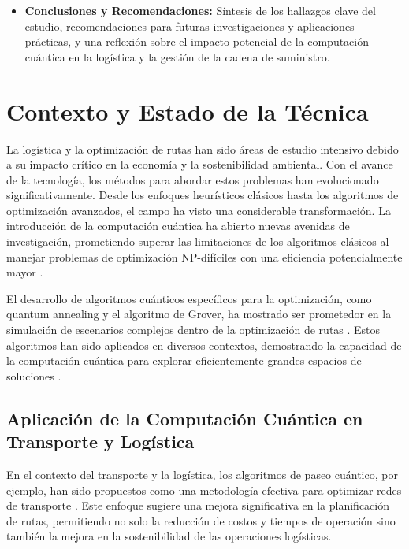 \documentclass[11pt,a4paper,spanish]{book}
\begin{document}
\begin{itemize}
	\item \textbf{Conclusiones y Recomendaciones:} Síntesis de los hallazgos clave del estudio, recomendaciones para futuras investigaciones y aplicaciones prácticas, y una reflexión sobre el impacto potencial de la computación cuántica en la logística y la gestión de la cadena de suministro.
	
\end{itemize}

\chapter{Contexto y Estado de la Técnica}

La logística y la optimización de rutas han sido áreas de estudio intensivo debido a su impacto crítico en la economía y la sostenibilidad ambiental. Con el avance de la tecnología, los métodos para abordar estos problemas han evolucionado significativamente. Desde los enfoques heurísticos clásicos hasta los algoritmos de optimización avanzados, el campo ha visto una considerable transformación. La introducción de la computación cuántica ha abierto nuevas avenidas de investigación, prometiendo superar las limitaciones de los algoritmos clásicos al manejar problemas de optimización NP-difíciles con una eficiencia potencialmente mayor \citep{nielsenChuang}.

El desarrollo de algoritmos cuánticos específicos para la optimización, como quantum annealing y el algoritmo de Grover, ha mostrado ser prometedor en la simulación de escenarios complejos dentro de la optimización de rutas \citep{farhiQuantum, groverAlgorithm}. Estos algoritmos han sido aplicados en diversos contextos, demostrando la capacidad de la computación cuántica para explorar eficientemente grandes espacios de soluciones \citep{QWalk-Based}.

\section{Aplicación de la Computación Cuántica en Transporte y Logística}

En el contexto del transporte y la logística, los algoritmos de paseo cuántico, por ejemplo, han sido propuestos como una metodología efectiva para optimizar redes de transporte \citep{quantumTransportOpt}. Este enfoque sugiere una mejora significativa en la planificación de rutas, permitiendo no solo la reducción de costos y tiempos de operación sino también la mejora en la sostenibilidad de las operaciones logísticas.
\end{document}
